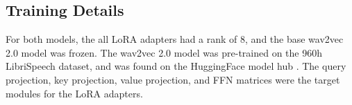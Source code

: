 \subsection{Training Details}
For both models, the all LoRA adapters had a rank of 8, and the base wav2vec 2.0 model was frozen. 
The wav2vec 2.0 model was pre-trained on the 960h LibriSpeech dataset, and was found on the HuggingFace model hub \cite{huggingface}.
The query projection, key projection, value projection, and FFN matrices were the target modules for the LoRA adapters.
